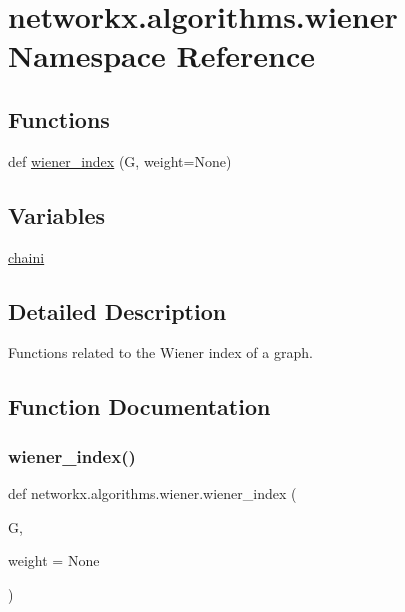 \hypertarget{namespacenetworkx_1_1algorithms_1_1wiener}{}\section{networkx.\+algorithms.\+wiener Namespace Reference}
\label{namespacenetworkx_1_1algorithms_1_1wiener}
\subsection*{Functions}
\begin{DoxyCompactItemize}
\item 
def \hyperlink{namespacenetworkx_1_1algorithms_1_1wiener_ab49bb196b755d9acbb0d05ba1b3b1b49}{wiener\+\_\+index} (G, weight=None)
\end{DoxyCompactItemize}
\subsection*{Variables}
\begin{DoxyCompactItemize}
\item 
\hyperlink{namespacenetworkx_1_1algorithms_1_1wiener_a20d91ae0d61b08010a0fbacb6e6f49aa}{chaini}
\end{DoxyCompactItemize}


\subsection{Detailed Description}
\begin{DoxyVerb}Functions related to the Wiener index of a graph.\end{DoxyVerb}
 

\subsection{Function Documentation}
\mbox{\label{namespacenetworkx_1_1algorithms_1_1wiener_ab49bb196b755d9acbb0d05ba1b3b1b49}} 
\subsubsection{\texorpdfstring{wiener\+\_\+index()}{wiener\_index()}}
{\footnotesize\ttfamily def networkx.\+algorithms.\+wiener.\+wiener\+\_\+index (\begin{DoxyParamCaption}\item[{}]{G,  }\item[{}]{weight = {\ttfamily None} }\end{DoxyParamCaption})}


